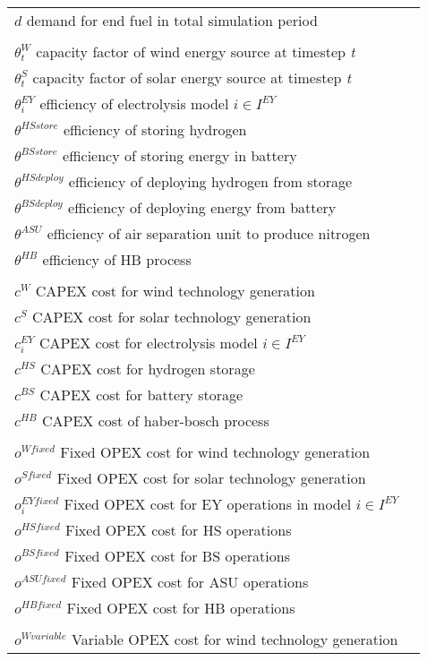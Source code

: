 \documentclass[12 pt]{article}
\begin{document}
\begin{tabular}{ll}

$d$  demand for end fuel in total simulation period \\
\\
$\theta^{W}_{t}$ capacity factor of wind energy source at timestep \textit{t} \\
$\theta^{S}_{t}$ capacity factor of solar energy source at timestep \textit{t} \\
$\theta^{EY}_{i}$ efficiency of electrolysis model $i \in I^{EY}$\\
$\theta^{HS store}$ efficiency of storing hydrogen \\
$\theta^{BS store}$ efficiency of storing energy in battery \\
$\theta^{HS deploy}$ efficiency of deploying hydrogen from storage\\
$\theta^{BS deploy}$ efficiency of deploying energy from battery \\
$\theta^{ASU}$ efficiency of air separation unit to produce nitrogen \\
$\theta^{HB}$ efficiency of HB process\\
\\
$c^{W}$ CAPEX cost for wind technology generation \\
$c^{S}$ CAPEX cost for solar technology generation \\
$c^{EY}_{i}$ CAPEX cost for electrolysis model $i \in I^{EY}$\\
$c^{HS}$ CAPEX cost for hydrogen storage\\
$c^{BS}$ CAPEX cost for battery storage\\
$c^{HB}$ CAPEX cost of haber-bosch process \\
\\
$o^{W fixed}$ Fixed OPEX cost for wind technology generation \\
$o^{S fixed}$ Fixed OPEX cost for solar  technology generation \\
$o^{EY fixed}_{i}$ Fixed OPEX cost for EY operations in model $i \in I^{EY}$\\
$o^{HS fixed}$ Fixed OPEX cost for HS operations \\
$o^{BS fixed}$ Fixed OPEX cost for BS operations \\
$o^{ASU fixed}$ Fixed OPEX cost for ASU operations \\
$o^{HB fixed}$ Fixed OPEX cost for HB operations \\
\\
$o^{W variable}$ Variable OPEX cost for wind technology generation \\

\end{tabular}
\end{document}
